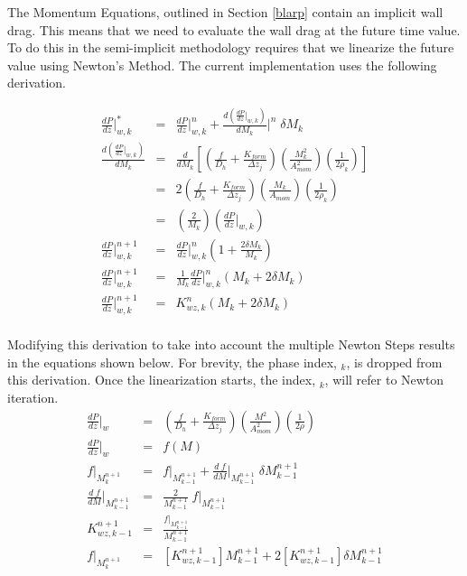 The Momentum Equations, outlined in Section \ref{blarp} contain an implicit wall drag. This means that we need to evaluate the wall drag at the future time value. To do this in the semi-implicit methodology requires that we linearize the future value using Newton's Method. The current implementation uses the following derivation.

\begin{eqnarray}
\frac{dP}{dz}\bigg\vert^{*}_{w,k} & = & \frac{dP}{dz}\bigg\vert^{n}_{w,k}+\frac{d (\frac{dP}{dz}\big\vert_{w,k})}{d M_k}\bigg\vert^{n}\;\delta M_k\\
\frac{d (\frac{dP}{dz}\big\vert_{w,k})}{d M_k} & = & \frac{d}{d M_k}\left[\left(\frac{f}{D_h}+\frac{K_{form}}{\Delta z_j}\right)\left(\frac{M^2_k}{A^2_{mom}}\right)\left(\frac{1}{2\rho_k}\right) \right]\\
& = & 2 \left(\frac{f}{D_h}+\frac{K_{form}}{\Delta z_j}\right)\left(\frac{M_k}{A_{mom}}\right)\left(\frac{1}{2\rho_k}\right)\\
& = & \left(\frac{2}{M_k}\right)\left(\frac{dP}{dz}\bigg\vert_{w,k}\right) \\
\frac{dP}{dz}\bigg\vert^{n+1}_{w,k} & = & \frac{dP}{dz}\bigg\vert^{n}_{w,k}\left(1+\frac{2 \delta M_k}{M_k}\right) \\
\frac{dP}{dz}\bigg\vert^{n+1}_{w,k} & = & \frac{1}{M_k}\frac{dP}{dz}\bigg\vert^{n}_{w,k}\left(M_k+2\delta M_k\right) \\
\frac{dP}{dz}\bigg\vert^{n+1}_{w,k} & = & K^{n}_{wz,k}\left(M_k+2\delta M_k\right) \\
\end{eqnarray}

Modifying this derivation to take into account the multiple Newton Steps results in the equations shown below. For brevity, the phase index, $_k$, is dropped from this derivation. Once the linearization starts, the index, $_k$, will refer to Newton iteration. 
\begin{eqnarray}
\label{NewPressureLoss}
\frac{dP}{dz}\bigg\vert_{w}& = & \left(\frac{f}{D_h}+\frac{K_{form}}{\Delta z_j}\right)\left(\frac{M^2}{A^2_{mom}}\right)\left(\frac{1}{2\rho}\right)\\
\frac{dP}{dz}\bigg\vert_{w} & = & f(M) \\
f|_{M^{n+1}_{k}} & = & f|_{M^{n+1}_{k-1}}+\frac{d\; f }{d M}\bigg\vert_{M_{k-1}^{n+1}}\;\delta M^{n+1}_{k-1}\\
\frac{d\; f }{d M}\bigg\vert_{M_{k-1}^{n+1}} & = & \frac{2}{M^{n+1}_{k-1}}\; f|_{M^{n+1}_{k-1}}\\
K^{n+1}_{wz,k-1} & = & \frac{f|_{M^{n+1}_{k-1}}}{M^{n+1}_{k-1}} \\
f|_{M^{n+1}_{k}} & = & [K^{n+1}_{wz,k-1}] M_{k-1}^{n+1}+2 \left[K^{n+1}_{wz,k-1} \right]\delta M^{n+1}_{k-1}
\end{eqnarray}

